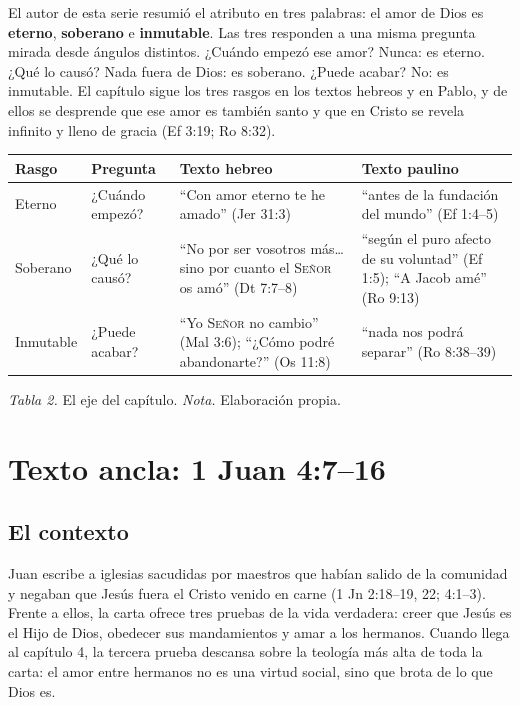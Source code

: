 \documentclass[11pt,letterpaper]{article}
\newcommand{\SENOR}{\textsc{Señor}}
\newcommand{\destacar}[1]{\textbf{\textcolor{azul}{#1}}}
\begin{document}
El autor de esta serie resumió el atributo en tres palabras: el amor de Dios es \destacar{eterno}, \destacar{soberano} e \destacar{inmutable}. Las tres responden a una misma pregunta mirada desde ángulos distintos. ¿Cuándo empezó ese amor? Nunca: es eterno. ¿Qué lo causó? Nada fuera de Dios: es soberano. ¿Puede acabar? No: es inmutable. El capítulo sigue los tres rasgos en los textos hebreos y en Pablo, y de ellos se desprende que ese amor es también santo y que en Cristo se revela infinito y lleno de gracia (Ef 3:19; Ro 8:32).

\begin{center}\small\renewcommand{\arraystretch}{1.2}
\begin{tabular}{@{}L{2.4cm}L{4.6cm}L{4.0cm}L{3.8cm}@{}}
\toprule
\textbf{Rasgo} & \textbf{Pregunta} & \textbf{Texto hebreo} & \textbf{Texto paulino} \\ \midrule
Eterno & ¿Cuándo empezó? & ``Con amor eterno te he amado'' (Jer 31:3) & ``antes de la fundación del mundo'' (Ef 1:4--5) \\
Soberano & ¿Qué lo causó? & ``No por ser vosotros más\ldots{} sino por cuanto el \SENOR{} os amó'' (Dt 7:7--8) & ``según el puro afecto de su voluntad'' (Ef 1:5); ``A Jacob amé'' (Ro 9:13) \\
Inmutable & ¿Puede acabar? & ``Yo \SENOR{} no cambio'' (Mal 3:6); ``¿Cómo podré abandonarte?'' (Os 11:8) & ``nada nos podrá separar'' (Ro 8:38--39) \\
\bottomrule
\end{tabular}\par
{\footnotesize\color{gris}\textit{Tabla 2.} El eje del capítulo. \textit{Nota.} Elaboración propia.}
\end{center}

\section{Texto ancla: 1 Juan 4:7--16}

\subsection{El contexto}
Juan escribe a iglesias sacudidas por maestros que habían salido de la comunidad y negaban que Jesús fuera el Cristo venido en carne (1 Jn 2:18--19, 22; 4:1--3). Frente a ellos, la carta ofrece tres pruebas de la vida verdadera: creer que Jesús es el Hijo de Dios, obedecer sus mandamientos y amar a los hermanos. Cuando llega al capítulo 4, la tercera prueba descansa sobre la teología más alta de toda la carta: el amor entre hermanos no es una virtud social, sino que brota de lo que Dios es.
\end{document}
